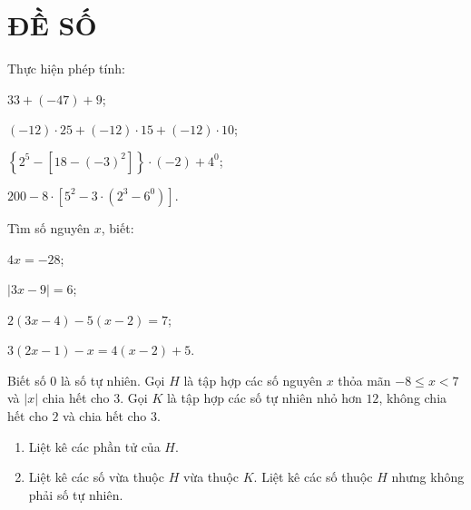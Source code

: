 
\section{ĐỀ SỐ \thesection }
\setcounter{bt}{0}

\begin{bt} Thực hiện phép tính:
	\begin{listEX}
		\item $33+(-47)+9$;
		\item $(-12)\cdot 25+(-12)\cdot 15+(-12)\cdot 10$;
		\item $\left\{2^{5}-\left[18-(-3)^{2}\right]\right\}\cdot(-2)+4^{0}$;
		\item $200-8\cdot\left[5^{2}-3\cdot\left(2^{3}-6^{0}\right)\right]$.
	\end{listEX}
\end{bt}

\begin{bt} Tìm số nguyên $x$, biết:
	\begin{listEX}
		\item $4x=-28$;
		\item $|3x-9|=6$;
		\item $2(3x-4)-5(x-2)=7$;
		\item $3(2x-1)-x=4(x-2)+5$.
	\end{listEX}
\end{bt}

\begin{bt} Biết số $0$ là số tự nhiên. Gọi $H$ là tập hợp các số nguyên $x$ thỏa mãn $-8\le x<7$ và $|x|$ chia hết cho $3$. Gọi $K$ là tập hợp các số tự nhiên nhỏ hơn $12$, không chia hết cho $2$ và chia hết cho $3$.
	\begin{enumerate}
		\item Liệt kê các phần tử của $H$.
		\item Liệt kê các số vừa thuộc $H$ vừa thuộc $K$. Liệt kê các số thuộc $H$ nhưng không phải số tự nhiên.
	\end{enumerate}
\end{bt}

